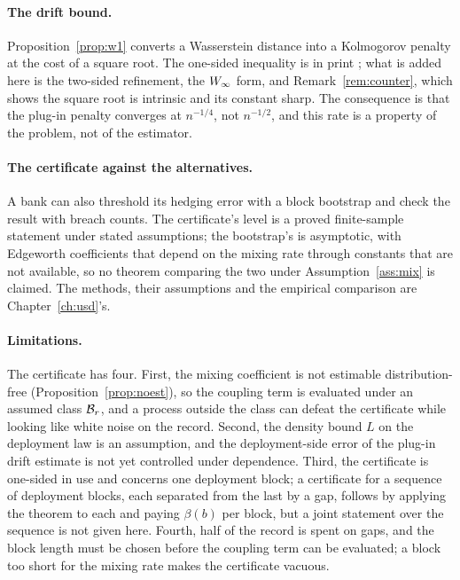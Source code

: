 \documentclass[../../../main.tex]{subfiles}
\begin{document}
\paragraph{The drift bound.} Proposition~\ref{prop:w1} converts a Wasserstein distance into a Kolmogorov penalty at the cost of a square root. The one-sided inequality is in print \citep[Prop.~1, p.~4]{xu2025}; what is added here is the two-sided refinement, the $W_\infty$ form, and Remark~\ref{rem:counter}, which shows the square root is intrinsic and its constant sharp. The consequence is that the plug-in penalty converges at $n^{-1/4}$, not $n^{-1/2}$, and this rate is a property of the problem, not of the estimator.

\paragraph{The certificate against the alternatives.} A bank can also threshold its hedging error with a block bootstrap and check the result with breach counts. The certificate's level is a proved finite-sample statement under stated assumptions; the bootstrap's is asymptotic, with Edgeworth coefficients that depend on the mixing rate through constants that are not available, so no theorem comparing the two under Assumption~\ref{ass:mix} is claimed. The methods, their assumptions and the empirical comparison are Chapter~\ref{ch:usd}'s.

\paragraph{Limitations.} The certificate has four. First, the mixing coefficient is not estimable distribution-free (Proposition~\ref{prop:noest}), so the coupling term is evaluated under an assumed class $\mathcal B_{r}$, and a process outside the class can defeat the certificate while looking like white noise on the record. Second, the density bound $L$ on the deployment law is an assumption, and the deployment-side error of the plug-in drift estimate is not yet controlled under dependence. Third, the certificate is one-sided in use and concerns one deployment block; a certificate for a sequence of deployment blocks, each separated from the last by a gap, follows by applying the theorem to each and paying $\beta(b)$ per block, but a joint statement over the sequence is not given here. Fourth, half of the record is spent on gaps, and the block length must be chosen before the coupling term can be evaluated; a block too short for the mixing rate makes the certificate vacuous.
\end{document}
